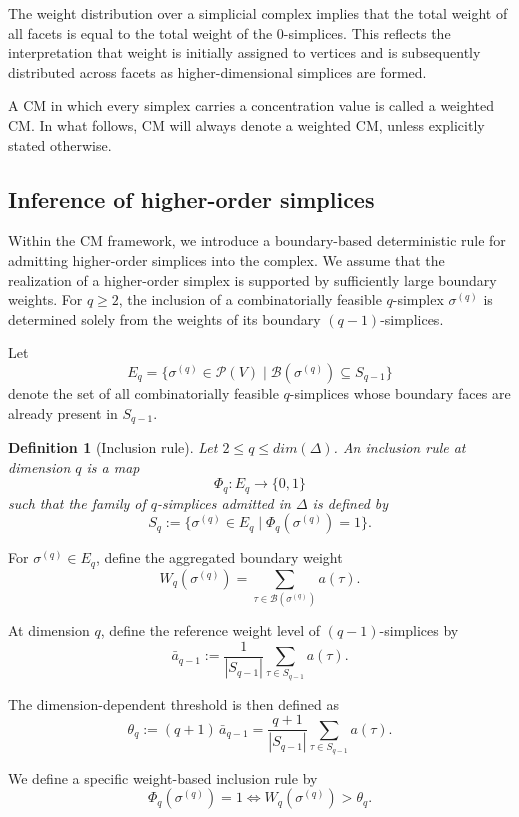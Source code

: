 \documentclass[12pt]{article}
\theoremstyle{normalhead_nobrackets}
\newtheorem{definition}{Definition}[section]
\theoremstyle{exampstyle}
\begin{document}
The weight distribution over a simplicial complex implies that the total weight of all facets is equal to the total weight of the $0$-simplices. This reflects the interpretation that weight is initially assigned to vertices and is subsequently distributed across facets as higher-dimensional simplices are formed.

A CM in which every simplex carries a concentration value is called a weighted CM. In what follows, CM will always denote a weighted CM, unless explicitly stated otherwise. 




\subsection{Inference of higher-order simplices}

Within the CM framework, we introduce a boundary-based deterministic rule for admitting higher-order simplices into the complex. We assume that the realization of a higher-order simplex is supported by sufficiently large boundary weights.
For $q \ge 2$, the inclusion of a combinatorially feasible $q$-simplex $\sigma^{(q)}$ is determined solely from the weights of its boundary $(q-1)$-simplices.

Let
\[
E_q = \{ \sigma^{(q)} \in \mathcal{P}(V) 
\mid \mathcal{B}(\sigma^{(q)}) \subseteq S_{q-1} \}
\]
denote the set of all combinatorially feasible $q$-simplices whose boundary faces are already present in $S_{q-1}$.

\begin{definition}[Inclusion rule]
Let $2 \leq q \leq dim(\Delta)$. An inclusion rule at dimension $q$ is a map
\[
\Phi_q : E_q \to \{0,1\}
\]
such that the family of $q$-simplices admitted in $\Delta$ is defined by
\[
S_q := \{ \sigma^{(q)} \in E_q \mid \Phi_q(\sigma^{(q)}) = 1 \}.
\]
\end{definition}

For $\sigma^{(q)} \in E_q$, define the aggregated boundary weight
\[
W_q(\sigma^{(q)}) 
= \sum_{\tau \in \mathcal{B}(\sigma^{(q)})} a(\tau).
\]

At dimension $q$, define the reference weight level of $(q-1)$-simplices by
\[
\bar{a}_{q-1} 
:= \frac{1}{|S_{q-1}|} 
\sum_{\tau \in S_{q-1}} a(\tau).
\]

The dimension-dependent threshold is then defined as
\[
\theta_q := (q+1)\,\bar{a}_{q-1}
= \frac{q+1}{|S_{q-1}|}
\sum_{\tau \in S_{q-1}} a(\tau).
\]

We define a specific weight-based inclusion rule by
\[
\Phi_q(\sigma^{(q)}) = 1 
\iff
W_q(\sigma^{(q)}) > \theta_q.
\]
\end{document}
